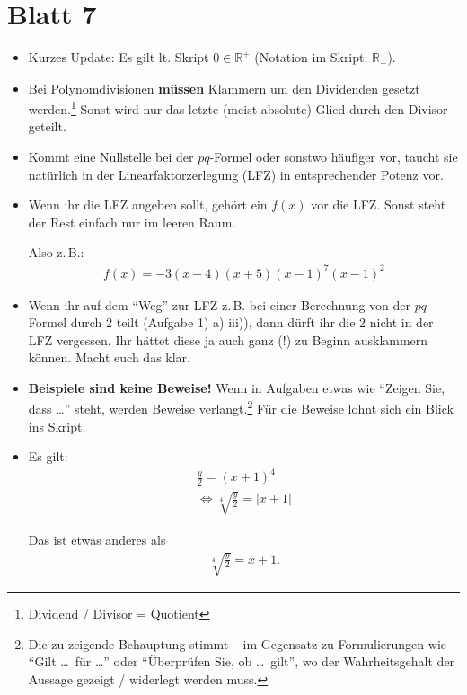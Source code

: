 \documentclass[11pt, a4paper]{article}
\newcommand{\R}{\mathbb{R}}
\begin{document}
\section*{Blatt 7}
\begin{itemize}
\item Kurzes Update: Es gilt lt. Skript $0 \in \R^{+}$ (Notation im Skript: $\R_{+}$).

\item Bei Polynomdivisionen \textbf{müssen} Klammern um den Dividenden gesetzt werden.\footnote{Dividend / Divisor = Quotient} Sonst wird nur das letzte (meist absolute) Glied durch den Divisor geteilt.

\item Kommt eine Nullstelle bei der $pq$-Formel oder sonstwo häufiger vor, taucht sie natürlich in der Linearfaktorzerlegung (LFZ) in entsprechender Potenz vor.

\item Wenn ihr die LFZ angeben sollt, gehört ein $f(x)$ vor die LFZ. Sonst steht der Rest einfach nur im leeren Raum. 

Also z.\,B.:
\begin{align*}
f(x) = -3(x-4)(x+5)(x-1)^7(x-1)^2
\end{align*}

\item Wenn ihr auf dem \enquote{Weg} zur LFZ z.\,B. bei einer Berechnung von der $pq$-Formel durch $2$ teilt (Aufgabe 1) a) iii)), dann dürft ihr die 2 nicht in der LFZ vergessen. Ihr hättet diese ja auch ganz (!) zu Beginn ausklammern können. Macht euch das klar.

\item \textbf{Beispiele sind keine Beweise!} Wenn in Aufgaben etwas wie \enquote{Zeigen Sie, dass \dots} steht, werden Beweise verlangt.\footnote{Die zu zeigende Behauptung stimmt -- im Gegensatz zu Formulierungen wie \enquote{Gilt \dots~für \dots} oder \enquote{Überprüfen Sie, ob \dots~gilt}, wo der Wahrheitsgehalt der Aussage gezeigt / widerlegt werden muss.} Für die Beweise lohnt sich ein Blick ins Skript.

\item Es gilt:
\begin{align*}
\frac{y}{2} = (x+1)^4\\
\Leftrightarrow \sqrt[4]{\frac{y}{2}} = |x + 1|
\end{align*}

Das ist etwas anderes als
\begin{align*}
\sqrt[4]{\frac{y}{2}} = x + 1.
\end{align*}


\end{itemize}
\end{document}
